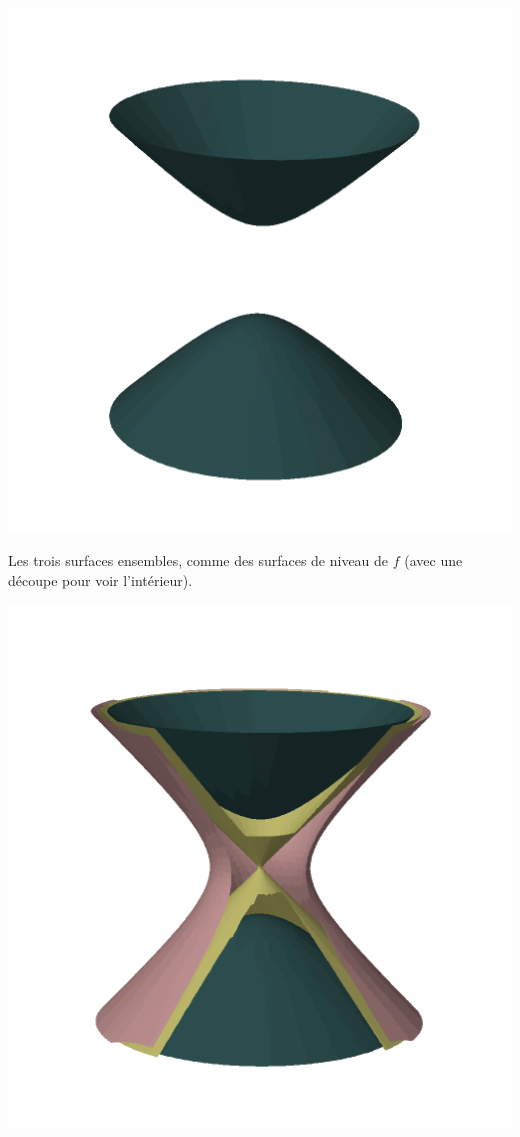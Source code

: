 \documentclass[12pt, class=report,crop=false]{standalone}
\begin{document}
\begin{exemple}
\begin{center}
  \includegraphics[scale=0.25]{figures/fig-gradient-06b}
\end{center}
Les trois surfaces ensembles, comme des surfaces de niveau de $f$ (avec une découpe pour voir l'intérieur). 
\begin{center}  
  \includegraphics[scale=0.4]{figures/fig-gradient-06a}   
\end{center}

  
\end{exemple}
\end{document}
